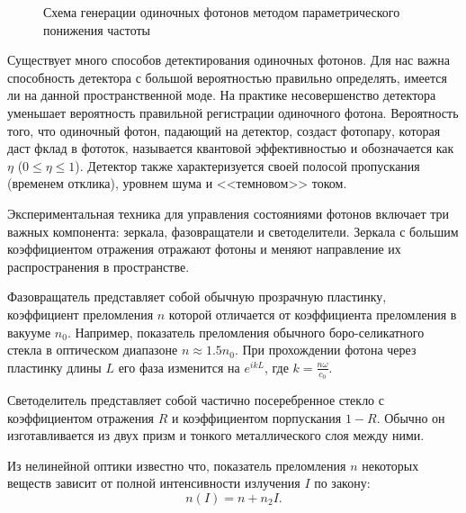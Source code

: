 \begin{figure}[H]
  \centering
  \caption{Схема генерации одиночных фотонов методом параметрического понижения
  частоты}
\end{figure}

Существует много способов детектирования одиночных фотонов. Для нас важна
способность детектора с большой вероятностью правильно определять, имеется ли
на данной пространственной моде. На практике несовершенство детектора уменьшает
вероятность правильной регистрации одиночного фотона. Вероятность того, что
одиночный фотон, падающий на детектор, создаст фотопару, которая даст фклад в
фототок, называется квантовой эффективностью и обозначается как $\eta$ 
($0 \leq \eta \leq 1$). Детектор также характеризуется своей полосой
пропускания (временем отклика), уровнем шума и <<темновом>> током.

Экспериментальная техника для управления состояниями фотонов включает три
важных компонента: зеркала, фазовращатели и светоделители. Зеркала с большим
коэффициентом отражения отражают фотоны и меняют направление их распространения
в пространстве.

Фазовращатель представляет собой обычную прозрачную пластинку,
коэффициент преломления $n$ которой отличается от коэффициента преломления в
вакууме $n_0$.  Например, показатель преломления обычного боро-селикатного
стекла в оптическом диапазоне $n \approx 1.5n_0$. При прохождении фотона через
пластинку длины $L$ его фаза изменится на $e^{ikL}$, где
$k=\frac{n\omega}{c_0}$.

Светоделитель представляет собой частично посеребренное стекло с коэффициентом
отражения $R$ и коэффициентом порпускания $1-R$. Обычно он изготавливается из
двух призм и тонкого металлического слоя между ними.

Из нелинейной оптики известно что, показатель преломления $n$ некоторых веществ
зависит от полной интенсивности излучения $I$ по закону:
\begin{equation}
  n(I) = n + n_2I.
\end{equation}

